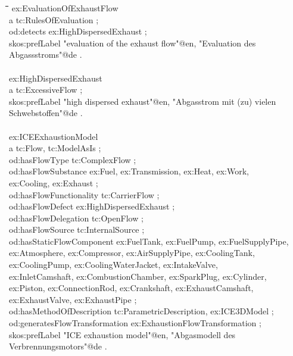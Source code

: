 \documentclass[a4paper,11pt]{article}
\newenvironment{code}{\tt \begin{tabbing}
\hskip12pt\=\hskip12pt\=\hskip12pt\=\hskip12pt\=\hskip5cm\=\hskip5cm\=\kill}
{\end{tabbing}}
\begin{document}
\begin{itemize}
    \begin{code}    
    ex:EvaluationOfExhaustFlow \\
    \> a tc:RulesOfEvaluation ; \\
    \> od:detects ex:HighDispersedExhaust ; \\
    \> skos:prefLabel "evaluation of the exhaust flow"@en, "Evaluation des  \\
    \> Abgassstroms"@de . \\
    \\
    ex:HighDispersedExhaust \\
    \> a tc:ExcessiveFlow ; \\
    \> skos:prefLabel "high dispersed exhaust"@en, "Abgasstrom mit (zu) vielen  \\
    \> Schwebstoffen"@de . \\
    \\
    ex:ICEExhaustionModel \\
    \> a tc:Flow, tc:ModelAsIs ; \\
    \> od:hasFlowType tc:ComplexFlow ; \\
    \> od:hasFlowSubstance ex:Fuel, ex:Transmission, ex:Heat, ex:Work,  \\
    \> ex:Cooling, ex:Exhaust ; \\
    \> od:hasFlowFunctionality tc:CarrierFlow ; \\
    \> od:hasFlowDefect ex:HighDispersedExhaust ; \\
    \> od:hasFlowDelegation tc:OpenFlow ; \\
    \> od:hasFlowSource tc:InternalSource ; \\
    \> od:hasStaticFlowComponent ex:FuelTank, ex:FuelPump, ex:FuelSupplyPipe,\\
    \> ex:Atmosphere, ex:Compressor, ex:AirSupplyPipe, ex:CoolingTank, \\
    \> ex:CoolingPump, ex:CoolingWaterJacket, ex:IntakeValve, \\
    \> ex:InletCamshaft, ex:CombustionChamber, ex:SparkPlug, ex:Cylinder, \\
    \> ex:Piston, ex:ConnectionRod, ex:Crankshaft, ex:ExhaustCamshaft, \\
    \> ex:ExhaustValve, ex:ExhaustPipe ; \\
    \> od:hasMethodOfDescription tc:ParametricDescription, ex:ICE3DModel ; \\
    \> od:generatesFlowTransformation ex:ExhaustionFlowTransformation ; \\
    \> skos:prefLabel "ICE exhaustion model"@en, "Abgasmodell des Verbrennungsmotors"@de . \\
    \end{code}


\end{itemize}
\end{document}
